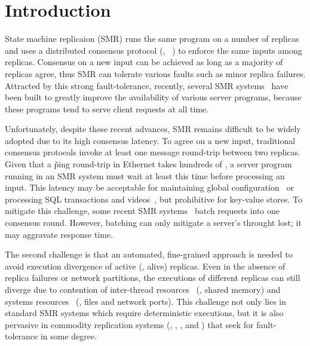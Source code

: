 \section{Introduction} \label{sec:intro}

State machine replicaion (SMR) runs the same program on a 
number of replicas and uses a distributed consensus protocol (\eg, 
\paxos~\cite{crane:sosp15}) to enforce the same inputs among 
replicas. Consensus on a new input can be achieved as long as a majority 
of replicas agree, thus SMR can tolerate various faults such as minor replica 
failures. Attracted by this strong fault-tolerance, recently, several SMR 
systems~\cite{chubby:osdi, zookeeper, crane:sosp15, eve:osdi12, rex:eurosys14} 
have been built to greatly improve the availability of various server programs, 
because these programs tend to serve client requests at all time.

Unfortunately, despite these recent advances, SMR remains difficult to be 
widely adopted due to its high consensus latency. To agree on a new 
input, traditional consensus protocols invoke at least one message round-trip 
between two replicas. Given that a \v{ping} round-trip in Ethernet takes 
hundreds of \us, a server program running in an SMR system must wait at least 
this time before processing an input. This latency may be acceptable for 
maintaining global configuration~\cite{chubby:osdi,zookeeper} or processing SQL 
transactions and videos~\cite{crane:sosp15,eve:osdi12}, but prohibitive for 
key-value stores. To mitigate this challenge, some recent SMR 
systems~\cite{calvin:sigmod12,rex:eusorys14} batch requests into one 
consensus round. However, batching can only mitigate a server's throught lost; 
it may aggravate response time.

The second challenge is that an automated, fine-grained approach is needed to 
avoid execution divergence of active (\ie, alive) replicas. Even in the absence 
of replica failures or network partitions, the executions of different replicas 
can still diverge due to contention of 
inter-thread resources~\cite{coredet:asplos10} (\eg, shared memory) and systems 
resources~\cite{racepro:sosp11} (\eg, files and network ports). This challenge 
not only lies in standard SMR systems which require deterministic executions, 
but it is also pervasive in commodity replication systems (\eg, \redis, 
\memcached, and \mysql) that seek for fault-tolerance in some degree.

